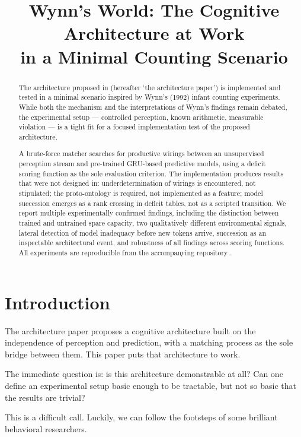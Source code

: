 \documentclass[12pt, a4paper]{article}
\title{Wynn's World: The Cognitive Architecture at Work\\
in a Minimal Counting Scenario}
\date{}
\begin{document}
\maketitle

\begin{abstract}
The architecture proposed in \cite{architecture} (hereafter `the architecture
paper') is implemented and tested in a minimal scenario inspired by Wynn's
(1992) infant counting experiments. While both the mechanism and the
interpretations of Wynn's findings remain debated, the experimental setup ---
controlled perception, known arithmetic, measurable violation --- is a tight
fit for a focused implementation test of the proposed architecture.

A brute-force matcher searches for productive wirings between an unsupervised
perception stream and pre-trained GRU-based predictive models, using a deficit
scoring function as the sole evaluation criterion. The implementation produces
results that were not designed in: underdetermination of wirings is
encountered, not stipulated; the proto-ontology is required, not implemented
as a feature; model succession emerges as a rank crossing in deficit tables,
not as a scripted transition. We report multiple experimentally confirmed
findings, including the distinction between trained and untrained spare
capacity, two qualitatively different environmental signals, lateral detection
of model inadequacy before new tokens arrive, succession as an inspectable
architectural event, and robustness of all findings across scoring functions.
All experiments are reproducible from the accompanying repository \cite{repo}.
\end{abstract}

\section{Introduction}
\label{sec:intro}

The architecture paper proposes a cognitive architecture built on the
independence of perception and prediction, with a matching process as the sole
bridge between them. This paper puts that architecture to work.

The immediate question is: is this architecture demonstrable at all? Can one
define an experimental setup basic enough to be tractable, but not so basic
that the results are trivial?

This is a difficult call. Luckily, we can follow the footsteps of some
brilliant behavioral researchers.
\end{document}

